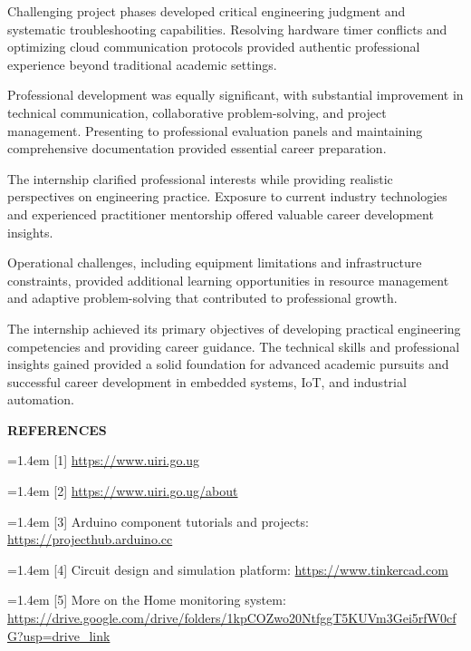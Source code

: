\documentclass[12pt,a4paper]{report}
\begin{document}
\noindent Challenging project phases developed critical engineering judgment and systematic troubleshooting capabilities. Resolving hardware timer conflicts and optimizing cloud communication protocols provided authentic professional experience beyond traditional academic settings.

\noindent Professional development was equally significant, with substantial improvement in technical communication, collaborative problem-solving, and project management. Presenting to professional evaluation panels and maintaining comprehensive documentation provided essential career preparation.

\noindent The internship clarified professional interests while providing realistic perspectives on engineering practice. Exposure to current industry technologies and experienced practitioner mentorship offered valuable career development insights.

\noindent Operational challenges, including equipment limitations and infrastructure constraints, provided additional learning opportunities in resource management and adaptive problem-solving that contributed to professional growth.

\noindent The internship achieved its primary objectives of developing practical engineering competencies and providing career guidance. The technical skills and professional insights gained provided a solid foundation for advanced academic pursuits and successful career development in embedded systems, IoT, and industrial automation.

\newpage
{\fontsize{14}{16.8}\selectfont\bfseries\centering REFERENCES\par}
\vspace{10pt}

\noindent\hangindent=1.4em [1] \url{https://www.uiri.go.ug}

\noindent\hangindent=1.4em [2] \url{https://www.uiri.go.ug/about}

\noindent\hangindent=1.4em [3] Arduino component tutorials and projects: 
\url{https://projecthub.arduino.cc}

\noindent\hangindent=1.4em [4] Circuit design and simulation platform: 
\url{https://www.tinkercad.com}

\noindent\hangindent=1.4em [5] More on the Home monitoring system: \\
\url{https://drive.google.com/drive/folders/1kpCOZwo20NtfggT5KUVm3Gei5rfW0cfG?usp=drive_link}
\end{document}
